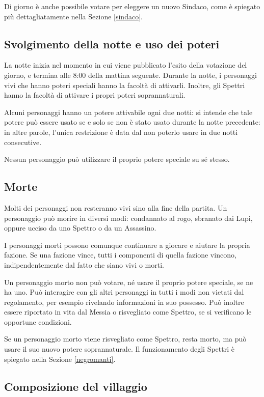 \documentclass[a4paper,10pt]{article}
\begin{document}
Di giorno è anche possibile votare per eleggere un nuovo Sindaco, come è spiegato più dettagliatamente nella Sezione \ref{sindaco}.


\subsection{Svolgimento della notte e uso dei poteri}

La notte inizia nel momento in cui viene pubblicato l'esito della votazione del giorno, e termina alle 8:00 della mattina seguente. Durante la notte, i personaggi vivi che hanno poteri speciali hanno la facoltà di attivarli. Inoltre, gli Spettri hanno la facoltà di attivare i propri poteri soprannaturali.

Alcuni personaggi hanno un potere attivabile ogni due notti: si intende che tale potere può essere usato se e solo se non è stato usato durante la notte precedente: in altre parole, l'unica restrizione è data dal non poterlo usare in due notti consecutive.

Nessun personaggio può utilizzare il proprio potere speciale su sé stesso.


\subsection{Morte}

Molti dei personaggi non resteranno vivi sino alla fine della partita. Un personaggio può morire in diversi modi: condannato al rogo, sbranato dai Lupi, oppure ucciso da uno Spettro o da un Assassino.

I personaggi morti possono comunque continuare a giocare e aiutare la propria fazione. Se una fazione vince, tutti i componenti di quella fazione vincono, indipendentemente dal fatto che siano vivi o morti.

Un personaggio morto non può votare, né usare il proprio potere speciale, se ne ha uno. Può interagire con gli altri personaggi in tutti i modi non vietati dal regolamento, per esempio rivelando informazioni in suo possesso. Può inoltre essere riportato in vita dal Messia o risvegliato come Spettro, se si verificano le opportune condizioni.

Se un personaggio morto viene risvegliato come Spettro, resta morto, ma può usare il suo nuovo potere soprannaturale. Il funzionamento degli Spettri è spiegato nella Sezione \ref{negromanti}.


\subsection{Composizione del villaggio}
 
\end{document}

